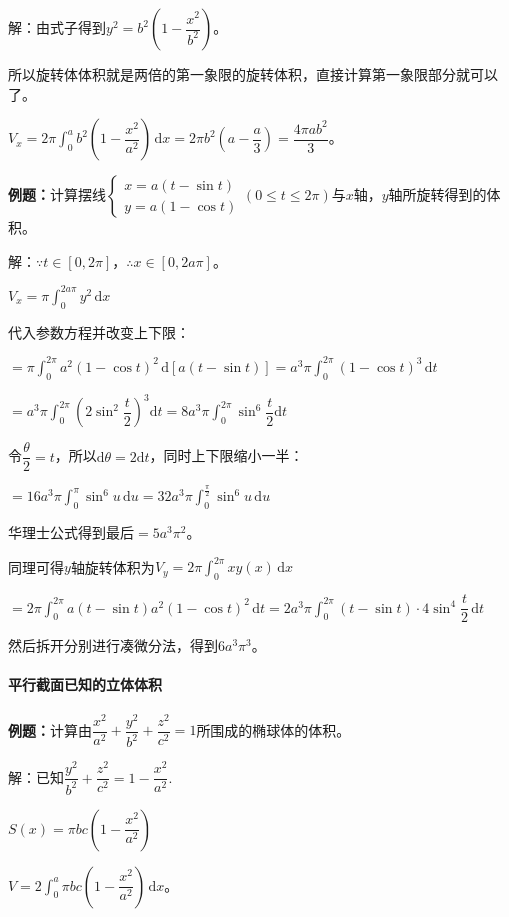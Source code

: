 \documentclass[UTF8, 12pt]{ctexart}
\begin{document}
解：由式子得到$y^2=b^2\left(1-\dfrac{x^2}{b^2}\right)$。

所以旋转体体积就是两倍的第一象限的旋转体积，直接计算第一象限部分就可以了。

$V_x=2\pi\displaystyle{\int_0^ab^2\left(1-\dfrac{x^2}{a^2}\right)\,\textrm{d}x}=2\pi b^2\left(a-\dfrac{a}{3}\right)=\dfrac{4\pi ab^2}{3}$。

\textbf{例题：}计算摆线$\left\{\begin{array}{l}
    x=a(t-\sin t) \\
    y=a(1-\cos t)
\end{array}
\right.$$(0\leqslant t\leqslant 2\pi)$与$x$轴，$y$轴所旋转得到的体积。

解：$\because t\in[0,2\pi]$，$\therefore x\in[0,2a\pi]$。

$V_x=\pi\int_0^{2a\pi}y^2\,\textrm{d}x$

代入参数方程并改变上下限：

$=\pi\int_0^{2\pi}a^2(1-\cos t)^2\,\textrm{d}[a(t-\sin t)]=a^3\pi\int_0^{2\pi}(1-\cos t)^3\,\textrm{d}t$

$=a^3\pi\displaystyle{\int_0^{2\pi}\left(2\sin^2\dfrac{t}{2}\right)^3\textrm{d}t}=8a^3\pi\displaystyle{\int_0^{2\pi}\sin^6\dfrac{t}{2}\textrm{d}t}$

令$\dfrac{\theta}{2}=t$，所以$\textrm{d}\theta=2\textrm{d}t$，同时上下限缩小一半：

$=16a^3\pi\int_0^\pi\sin^6u\,\textrm{d}u=32a^3\pi\int_0^{\frac{\pi}{2}}\sin^6u\,\textrm{d}u$

华理士公式得到最后$=5a^3\pi^2$。

同理可得$y$轴旋转体积为$V_y=2\pi\int_0^{2\pi}xy(x)\,\textrm{d}x$

$=2\pi\int_0^{2\pi}a(t-\sin t)a^2(1-\cos t)^2\,\textrm{d}t=2a^3\pi\int_0^{2\pi}(t-\sin t)\cdot 4\sin^4\dfrac{t}{2}\,\textrm{d}t$

然后拆开分别进行凑微分法，得到$6a^3\pi^3$。

\paragraph{平行截面已知的立体体积} \leavevmode \medskip

\textbf{例题：}计算由$\dfrac{x^2}{a^2}+\dfrac{y^2}{b^2}+\dfrac{z^2}{c^2}=1$所围成的椭球体的体积。

解：已知$\dfrac{y^2}{b^2}+\dfrac{z^2}{c^2}=1-\dfrac{x^2}{a^2}$.

$S(x)=\pi bc\left(1-\dfrac{x^2}{a^2}\right)$

$V=2\int_0^a\pi bc\left(1-\dfrac{x^2}{a^2}\right)\,\textrm{d}x$。
\end{document}

